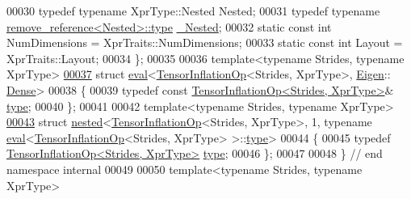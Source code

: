 \begin{DoxyCode}
00030   \textcolor{keyword}{typedef} \textcolor{keyword}{typename} XprType::Nested Nested;
00031   \textcolor{keyword}{typedef} \textcolor{keyword}{typename} \hyperlink{group___sparse_core___module}{remove\_reference<Nested>::type} 
      \hyperlink{group___sparse_core___module}{\_Nested};
00032   \textcolor{keyword}{static} \textcolor{keyword}{const} \textcolor{keywordtype}{int} NumDimensions = XprTraits::NumDimensions;
00033   \textcolor{keyword}{static} \textcolor{keyword}{const} \textcolor{keywordtype}{int} Layout = XprTraits::Layout;
00034 \};
00035 
00036 \textcolor{keyword}{template}<\textcolor{keyword}{typename} Str\textcolor{keywordtype}{id}es, \textcolor{keyword}{typename} XprType>
\hyperlink{struct_eigen_1_1internal_1_1eval_3_01_tensor_inflation_op_3_01_strides_00_01_xpr_type_01_4_00_01_eigen_1_1_dense_01_4}{00037} \textcolor{keyword}{struct }\hyperlink{struct_eigen_1_1internal_1_1eval}{eval}<\hyperlink{class_eigen_1_1_tensor_inflation_op}{TensorInflationOp}<Strides, XprType>, \hyperlink{namespace_eigen}{Eigen}::
      \hyperlink{struct_eigen_1_1_dense}{Dense}>
00038 \{
00039   \textcolor{keyword}{typedef} \textcolor{keyword}{const} \hyperlink{class_eigen_1_1_tensor_inflation_op}{TensorInflationOp<Strides, XprType>}& 
      \hyperlink{class_eigen_1_1_tensor_inflation_op}{type};
00040 \};
00041 
00042 \textcolor{keyword}{template}<\textcolor{keyword}{typename} Str\textcolor{keywordtype}{id}es, \textcolor{keyword}{typename} XprType>
\hyperlink{struct_eigen_1_1internal_1_1nested_3_01_tensor_inflation_op_3_01_strides_00_01_xpr_type_01_4_00_eeee4fbc81465d4717490c737a712fae}{00043} \textcolor{keyword}{struct }\hyperlink{struct_eigen_1_1internal_1_1nested}{nested}<\hyperlink{class_eigen_1_1_tensor_inflation_op}{TensorInflationOp}<Strides, XprType>, 1, typename 
      \hyperlink{struct_eigen_1_1internal_1_1eval}{eval}<\hyperlink{class_eigen_1_1_tensor_inflation_op}{TensorInflationOp}<Strides, XprType> >::\hyperlink{class_eigen_1_1_tensor_inflation_op}{type}>
00044 \{
00045   \textcolor{keyword}{typedef} \hyperlink{class_eigen_1_1_tensor_inflation_op}{TensorInflationOp<Strides, XprType>} 
      \hyperlink{class_eigen_1_1_tensor_inflation_op}{type};
00046 \};
00047 
00048 \}  \textcolor{comment}{// end namespace internal}
00049 
00050 \textcolor{keyword}{template}<\textcolor{keyword}{typename} Str\textcolor{keywordtype}{id}es, \textcolor{keyword}{typename} XprType>

\end{DoxyCode}
